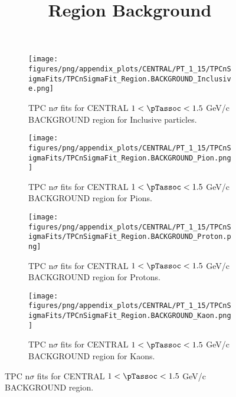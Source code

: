             \begin{figure}[H]
                \title{Region Background}
                \begin{subfigure}[b]{0.5\textwidth}
                    \centering
                    \texttt{[image: figures/png/appendix\_plots/CENTRAL/PT\_1\_15/TPCnSigmaFits/TPCnSigmaFit\_Region.BACKGROUND\_Inclusive.png]}
                    \caption{TPC n$\sigma$ fits for CENTRAL $1 < \pTassoc < 1.5$ GeV/c BACKGROUND region for Inclusive particles.}
                    \label{fig:appendix_CENTRAL_$1 < \pTassoc < 1.5$ GeV/c_BACKGROUND_Inclusive}
                \end{subfigure}
                \begin{subfigure}[b]{0.5\textwidth}
                    \centering
                    \texttt{[image: figures/png/appendix\_plots/CENTRAL/PT\_1\_15/TPCnSigmaFits/TPCnSigmaFit\_Region.BACKGROUND\_Pion.png]}
                    \caption{TPC n$\sigma$ fits for CENTRAL $1 < \pTassoc < 1.5$ GeV/c BACKGROUND region for Pions.}
                    \label{fig:appendix_CENTRAL_$1 < \pTassoc < 1.5$ GeV/c_BACKGROUND_Pion}
                \end{subfigure}
                \begin{subfigure}[b]{0.5\textwidth}
                    \centering
                    \texttt{[image: figures/png/appendix\_plots/CENTRAL/PT\_1\_15/TPCnSigmaFits/TPCnSigmaFit\_Region.BACKGROUND\_Proton.png]}
                    \caption{TPC n$\sigma$ fits for CENTRAL $1 < \pTassoc < 1.5$ GeV/c BACKGROUND region for Protons.}
                    \label{fig:appendix_CENTRAL_$1 < \pTassoc < 1.5$ GeV/c_BACKGROUND_Proton}
                \end{subfigure}
                \begin{subfigure}[b]{0.5\textwidth}
                    \centering
                    \texttt{[image: figures/png/appendix\_plots/CENTRAL/PT\_1\_15/TPCnSigmaFits/TPCnSigmaFit\_Region.BACKGROUND\_Kaon.png]}
                    \caption{TPC n$\sigma$ fits for CENTRAL $1 < \pTassoc < 1.5$ GeV/c BACKGROUND region for Kaons.}
                    \label{fig:appendix_CENTRAL_$1 < \pTassoc < 1.5$ GeV/c_BACKGROUND_Kaon}
                \end{subfigure}
                \caption{TPC n$\sigma$ fits for CENTRAL $1 < \pTassoc < 1.5$ GeV/c BACKGROUND region.}
                \label{fig:appendix_CENTRAL_$1 < \pTassoc < 1.5$ GeV/c_BACKGROUND}
            \end{figure}
            \clearpage
            
